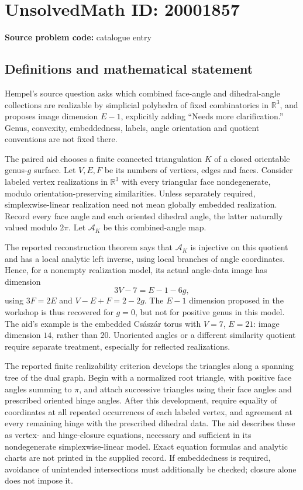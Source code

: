 \documentclass[11pt]{article}
\begin{document}
\section*{UnsolvedMath ID: 20001857}
\textbf{Source problem code:} catalogue entry
\subsection{Definitions and mathematical statement}
Hempel's source question asks which combined face-angle and dihedral-angle collections are realizable by simplicial polyhedra of fixed combinatorics in \(\mathbb R^3\), and proposes image dimension \(E-1\), explicitly adding ``Needs more clarification.'' Genus, convexity, embeddedness, labels, angle orientation and quotient conventions are not fixed there.

The paired aid chooses a finite connected triangulation \(K\) of a closed orientable genus-\(g\) surface. Let \(V,E,F\) be its numbers of vertices, edges and faces. Consider labeled vertex realizations in \(\mathbb R^3\) with every triangular face nondegenerate, modulo orientation-preserving similarities. Unless separately required, simplexwise-linear realization need not mean globally embedded realization. Record every face angle and each oriented dihedral angle, the latter naturally valued modulo \(2\pi\). Let \(\mathcal A_K\) be this combined-angle map.

The reported reconstruction theorem says that \(\mathcal A_K\) is injective on this quotient and has a local analytic left inverse, using local branches of angle coordinates. Hence, for a nonempty realization model, its actual angle-data image has dimension
\[
 3V-7=E-1-6g,
\]
using \(3F=2E\) and \(V-E+F=2-2g\). The \(E-1\) dimension proposed in the workshop is thus recovered for \(g=0\), but not for positive genus in this model. The aid's example is the embedded Cs\'asz\'ar torus with \(V=7\), \(E=21\): image dimension \(14\), rather than \(20\). Unoriented angles or a different similarity quotient require separate treatment, especially for reflected realizations.

The reported finite realizability criterion develops the triangles along a spanning tree of the dual graph. Begin with a normalized root triangle, with positive face angles summing to \(\pi\), and attach successive triangles using their face angles and prescribed oriented hinge angles. After this development, require equality of coordinates at all repeated occurrences of each labeled vertex, and agreement at every remaining hinge with the prescribed dihedral data. The aid describes these as vertex- and hinge-closure equations, necessary and sufficient in its nondegenerate simplexwise-linear model. Exact equation formulas and analytic charts are not printed in the supplied record. If embeddedness is required, avoidance of unintended intersections must additionally be checked; closure alone does not impose it.
\end{document}
